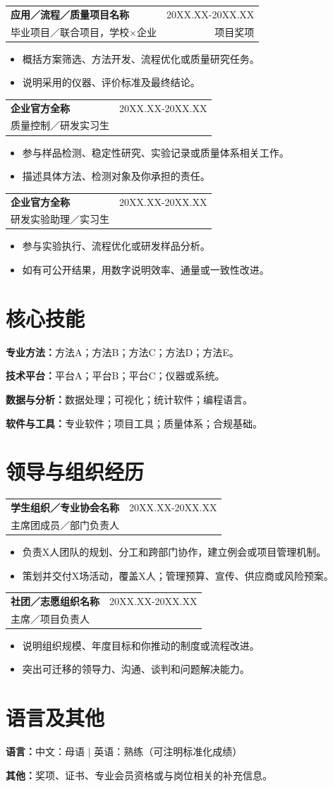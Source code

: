 \documentclass[a4paper,11pt]{article}
\makeatletter
\newcommand{\cvheading}[4]{%
  \par\addvspace{5pt}\noindent\begin{tabularx}{\linewidth}{@{}>{\raggedright\arraybackslash}Xr@{}}
    \textbf{#1} & \color{muted}\small #2 \\
    #3 & \color{muted}\small #4
  \end{tabularx}\par\vspace{-1pt}}
\newcommand{\cvheadingfirst}[4]{%
  \par\noindent\begin{tabularx}{\linewidth}{@{}>{\raggedright\arraybackslash}Xr@{}}
    \textbf{#1} & \color{muted}\small #2 \\
    #3 & \color{muted}\small #4
  \end{tabularx}\par\vspace{-1pt}}
\newenvironment{cvitems}{%
  \begin{itemize}[leftmargin=4.6mm,label=\raisebox{0.25ex}{\tiny$\bullet$},itemsep=2.2pt,topsep=2.4pt,parsep=0pt,partopsep=0pt]\justifying
}{\end{itemize}\vspace{2pt}}
\newcommand{\skillline}[2]{\justifying\textbf{#1：}#2\par\vspace{1.5pt}}
\makeatother
\begin{document}
\cvheading{应用／流程／质量项目名称}{20XX.XX-20XX.XX}{毕业项目／联合项目，学校×企业}{项目奖项}
\begin{cvitems}
  \item 概括方案筛选、方法开发、流程优化或质量研究任务。
  \item 说明采用的仪器、评价标准及最终结论。
\end{cvitems}

\cvheading{企业官方全称}{20XX.XX-20XX.XX}{质量控制／研发实习生}{ }
\begin{cvitems}
  \item 参与样品检测、稳定性研究、实验记录或质量体系相关工作。
  \item 描述具体方法、检测对象及你承担的责任。
\end{cvitems}

\cvheading{企业官方全称}{20XX.XX-20XX.XX}{研发实验助理／实习生}{ }
\begin{cvitems}
  \item 参与实验执行、流程优化或研发样品分析。
  \item 如有可公开结果，用数字说明效率、通量或一致性改进。
\end{cvitems}

\section{核心技能}
\skillline{专业方法}{方法A；方法B；方法C；方法D；方法E。}
\skillline{技术平台}{平台A；平台B；平台C；仪器或系统。}
\skillline{数据与分析}{数据处理；可视化；统计软件；编程语言。}
\skillline{软件与工具}{专业软件；项目工具；质量体系；合规基础。}

\section{领导与组织经历}
\cvheadingfirst{学生组织／专业协会名称}{20XX.XX-20XX.XX}{主席团成员／部门负责人}{ }
\begin{cvitems}
  \item 负责X人团队的规划、分工和跨部门协作，建立例会或项目管理机制。
  \item 策划并交付X场活动，覆盖X人；管理预算、宣传、供应商或风险预案。
\end{cvitems}

\cvheading{社团／志愿组织名称}{20XX.XX-20XX.XX}{主席／项目负责人}{ }
\begin{cvitems}
  \item 说明组织规模、年度目标和你推动的制度或流程改进。
  \item 突出可迁移的领导力、沟通、谈判和问题解决能力。
\end{cvitems}

\section{语言及其他}
\skillline{语言}{中文：母语 \enspace | \enspace 英语：熟练（可注明标准化成绩）}
\skillline{其他}{奖项、证书、专业会员资格或与岗位相关的补充信息。}
\end{document}
